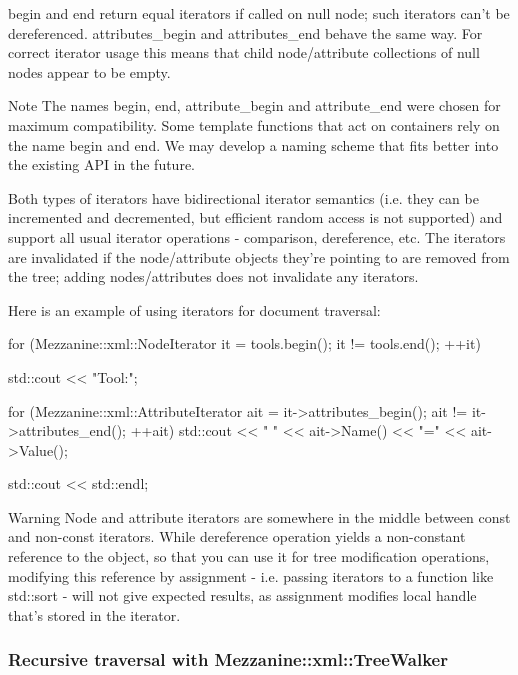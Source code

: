  \par
 begin and end return equal iterators if called on null node; such iterators can't be dereferenced. attributes\_\-begin and attributes\_\-end behave the same way. For correct iterator usage this means that child node/attribute collections of null nodes appear to be empty. \begin{DoxyNote}{Note}
The names begin, end, attribute\_\-begin and attribute\_\-end were chosen for maximum compatibility. Some template functions that act on containers rely on the name begin and end. We may develop a naming scheme that fits better into the existing API in the future.
\end{DoxyNote}
Both types of iterators have bidirectional iterator semantics (i.e. they can be incremented and decremented, but efficient random access is not supported) and support all usual iterator operations -\/ comparison, dereference, etc. The iterators are invalidated if the node/attribute objects they're pointing to are removed from the tree; adding nodes/attributes does not invalidate any iterators. \par
 \par
 Here is an example of using iterators for document traversal: 
\begin{DoxyCode}
 for (Mezzanine::xml::NodeIterator it = tools.begin(); it != tools.end(); ++it)
 {
     std::cout << "Tool:";

     for (Mezzanine::xml::AttributeIterator ait = it->attributes_begin(); ait != 
      it->attributes_end(); ++ait)
     {
         std::cout << " " << ait->Name() << "=" << ait->Value();
     }

     std::cout << std::endl;
 }
\end{DoxyCode}
 \begin{DoxyWarning}{Warning}
Node and attribute iterators are somewhere in the middle between const and non-\/const iterators. While dereference operation yields a non-\/constant reference to the object, so that you can use it for tree modification operations, modifying this reference by assignment -\/ i.e. passing iterators to a function like std::sort -\/ will not give expected results, as assignment modifies local handle that's stored in the iterator.
\end{DoxyWarning}
\hypertarget{XMLManual_XMLAccessingWalker}{}\subsubsection{Recursive traversal with Mezzanine::xml::TreeWalker}\label{XMLManual_XMLAccessingWalker}
